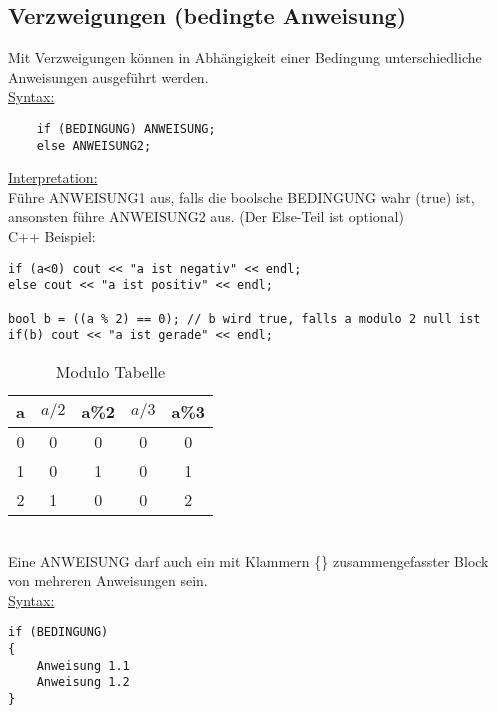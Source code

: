 \subsection{Verzweigungen (bedingte Anweisung)}
Mit Verzweigungen können in Abhängigkeit einer Bedingung unterschiedliche Anweisungen ausgeführt werden. \\
\underline{Syntax:} \\
\begin{lstlisting}
 	if (BEDINGUNG) ANWEISUNG;
	else ANWEISUNG2;
\end{lstlisting}
\underline{Interpretation:} \\
Führe ANWEISUNG1 aus, falls die boolsche BEDINGUNG wahr (true) ist, ansonsten führe ANWEISUNG2 aus. (Der Else-Teil ist optional) \\
C++ Beispiel:
\begin{lstlisting}
if (a<0) cout << "a ist negativ" << endl;
else cout << "a ist positiv" << endl;

bool b = ((a % 2) == 0); // b wird true, falls a modulo 2 null ist
if(b) cout << "a ist gerade" << endl;
\end{lstlisting}
\begin{table}[h]
	\caption[ModuloTabelle]{Modulo Tabelle}
	\begin{center}
	\begin{tabular}{c|c|c|c|c}
		a & $a/2$ & a\%2 & $a/3$ & a\%3 \\
		\hline
		0 & 0 & 0 & 0 & 0\\
		1 & 0 & 1 & 0 & 1 \\
		2 & 1 & 0 & 0 & 2 \\
	\end{tabular}
	\end{center}
\end{table}
~\\
Eine ANWEISUNG darf auch ein mit Klammern \{\} zusammengefasster Block von mehreren Anweisungen sein. \\
\underline{Syntax:} \\
\begin{lstlisting}
if (BEDINGUNG)
{
	Anweisung 1.1
	Anweisung 1.2
}
\end{lstlisting}
